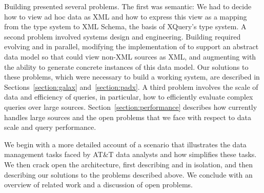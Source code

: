 Building \padx{} presented several problems. The first was semantic:
We had to decide how to view ad hoc data as XML and how to express
this view as a mapping from the \pads{} type system to XML Schema, the
basis of XQuery's type system.  A second problem involved systems
design and engineering.  Building \padx{} required evolving \pads{}
and \Galax{} in parallel, modifying the implementation of \Galax{} to
support an abstract data model so that \Galax{} could view non-XML
sources as XML, and augmenting \pads{} with the ability to generate
concrete instances of this data model.  Our solutions to these
problems, which were necessary to build a working system, are
described in Sections~\ref{section:galax} and~\ref{section:padx}.  A
third problem involves the scale of data and efficiency of queries, in
particular, how to efficiently evaluate complex queries over large
sources.  Section~\ref{section:performance} describes how \padx{}
currently handles large sources and the open problems that we face
with respect to data scale and query performance.

We begin with a more detailed account of a scenario that illustrates
the data management tasks faced by AT\&T data analysts and how \padx{}
simplifies these 
tasks.  We then crack open the \padx{} architecture, first describing
\pads{} and \Galax{} in isolation, and then describing our solutions
to the problems described above.  
We conclude with an overview of
related work and a discussion of open problems.

 
